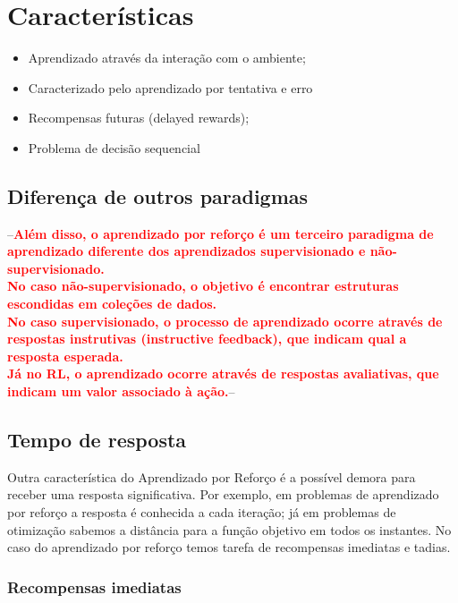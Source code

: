 \documentclass{article}
\newcommand{\todo}[1]{ --\textcolor{red}{\textbf{#1}}--}
\begin{document}
    \section{Características}
    
        \begin{itemize}
            \item Aprendizado através da interação com o ambiente;
            \item Caracterizado pelo aprendizado por tentativa e erro
            \item Recompensas futuras (delayed rewards);
            \item Problema de decisão sequencial
        \end{itemize}
        
        \subsection{Diferença de outros paradigmas}
        
            \todo{Além disso, o aprendizado por reforço é um terceiro paradigma de aprendizado diferente dos aprendizados supervisionado e não-supervisionado.\\
            No caso não-supervisionado, o objetivo é encontrar estruturas escondidas em coleções de dados.\\
            No caso supervisionado, o processo de aprendizado ocorre através de respostas instrutivas (instructive feedback), que indicam qual a resposta esperada.\\
            Já no RL, o aprendizado ocorre através de respostas avaliativas, que indicam um valor associado à ação.}
            
        \subsection{Tempo de resposta}
        
            Outra característica do Aprendizado por Reforço é a possível demora para receber uma resposta significativa. Por exemplo, em problemas de aprendizado por reforço a resposta é conhecida a cada iteração; já em problemas de otimização sabemos a distância para a função objetivo em todos os instantes. No caso do aprendizado por reforço temos tarefa de recompensas imediatas e tadias.
        
            \subsubsection{Recompensas imediatas}
        
\end{document}
